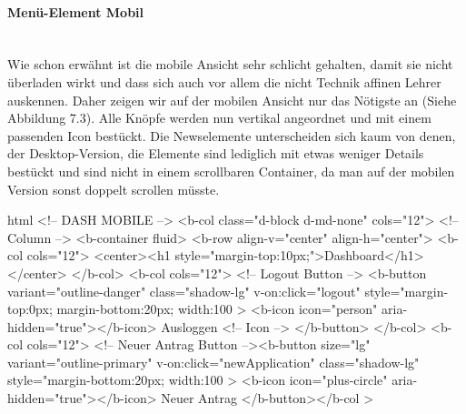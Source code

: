 \paragraph{Menü-Element Mobil}
~\\
Wie schon erwähnt ist die mobile Ansicht sehr schlicht gehalten, damit sie nicht überladen wirkt und dass sich auch vor allem die nicht Technik affinen Lehrer auskennen. Daher zeigen wir auf der mobilen Ansicht nur das Nötigste an (Siehe Abbildung 7.3). Alle Knöpfe werden nun vertikal angeordnet und mit einem passenden Icon bestückt. Die Newselemente unterscheiden sich kaum von denen, der Desktop-Version, die Elemente sind lediglich mit etwas weniger Details bestückt und sind nicht in einem scrollbaren Container, da man auf der mobilen Version sonst doppelt scrollen müsste.
\begin{code}{html}
	<!-- DASH MOBILE -->
	<b-col class="d-block d-md-none" cols="12">
	  <!-- Column -->
	  <b-container fluid>
		<b-row align-v="center" align-h="center">
		  <b-col cols="12">
			<center><h1 style="margin-top:10px;">Dashboard</h1></center>
		  </b-col>
		  <b-col cols="12">
			<!-- Logout Button -->
			<b-button
			  variant="outline-danger"
			  class="shadow-lg"
			  v-on:click="logout"
			  style="margin-top:0px; margin-bottom:20px; width:100%
			>
			  <b-icon icon="person" aria-hidden="true"></b-icon> Ausloggen
			  <!-- Icon -->
			</b-button>
		  </b-col>
		  <b-col cols="12">
			<!-- Neuer Antrag Button --><b-button
			  size="lg"
			  variant="outline-primary"
			  v-on:click="newApplication"
			  class="shadow-lg"
			  style="margin-bottom:20px; width:100%
			>
			  <b-icon icon="plus-circle" aria-hidden="true"></b-icon> Neuer
			  Antrag
			</b-button></b-col
		  >	
\end{code}
	\label{list:startmobile} ~\\
